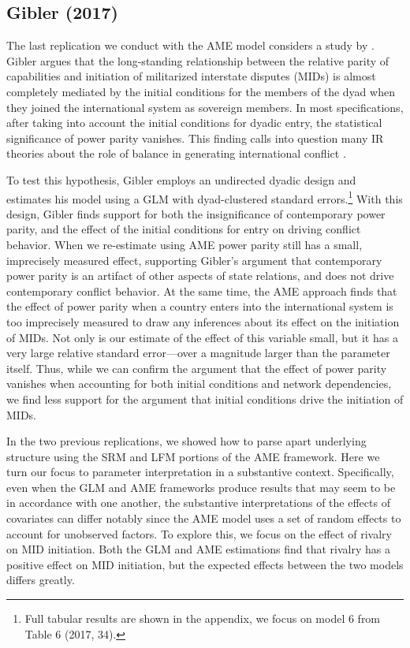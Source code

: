 \documentclass[12pt]{amsart}
\begin{document}
\subsection{Gibler (2017)}

The last replication we conduct with the AME model considers a study by \citet{gibler:2017}. Gibler argues that the long-standing relationship between the relative parity of capabilities and initiation of militarized interstate disputes (MIDs) is almost completely mediated by the initial conditions for the members of the dyad when they joined the international system as sovereign members. In most specifications, after taking into account the initial conditions for dyadic entry, the statistical significance of power parity vanishes. This finding calls into question many IR theories about the role of balance in generating international conflict \citep{organski:1958}.

To test this hypothesis, Gibler employs an undirected dyadic design and estimates his model using a GLM with dyad-clustered standard errors.\footnote{Full tabular results are shown in the appendix, we focus on model 6 from Table 6 (2017, 34).} With this design, Gibler finds support for both the insignificance of contemporary power parity, and the effect of the initial conditions for entry on driving conflict behavior. When we re-estimate using AME power parity still has a small, imprecisely measured effect, supporting Gibler's argument that contemporary power parity is an artifact of other aspects of state relations, and does not drive contemporary conflict behavior. At the same time, the AME approach finds that the effect of power parity when a country enters into the international system is too imprecisely measured to draw any inferences about its effect on the initiation of MIDs. Not only is our estimate of the effect of this variable small, but it has a very large relative standard error---over a magnitude larger than the parameter itself. Thus, while we can confirm the argument that the effect of power parity vanishes when accounting for both initial conditions and network dependencies, we find less support for the argument that initial conditions drive the initiation of MIDs.

In the two previous replications, we showed how to parse apart underlying structure using the SRM and LFM portions of the AME framework. Here we turn our focus to parameter interpretation in a substantive context. Specifically, even when the GLM and AME frameworks produce results that may seem to be in accordance with one another, the substantive interpretations of the effects of covariates can differ notably since the AME model uses a set of random effects to account for unobserved factors. To explore this, we focus on the effect of rivalry on MID initiation. Both the GLM and AME estimations find that rivalry has a positive effect on MID initiation, but the expected effects between the two models differs greatly.
\end{document}
